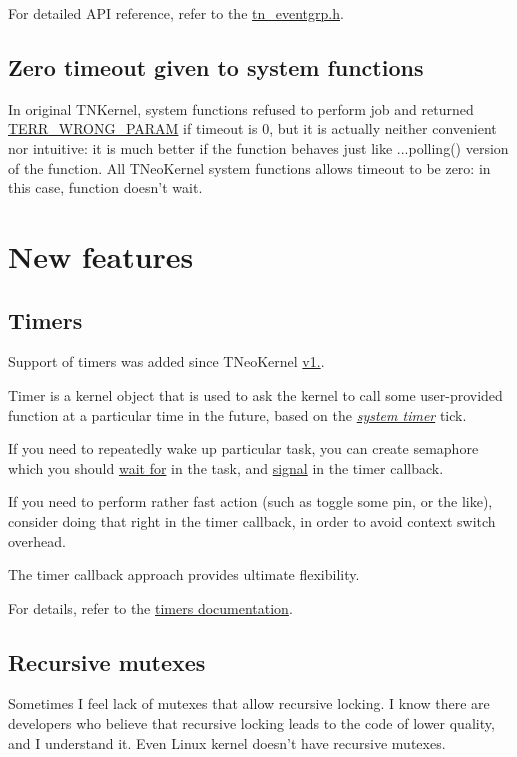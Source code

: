 For detailed A\+P\+I reference, refer to the {\ttfamily \hyperlink{tn__eventgrp_8h}{tn\+\_\+eventgrp.\+h}}.\hypertarget{tnkernel_diff_tnkernel_diff_zero_timeout}{}\subsection{Zero timeout given to system functions}\label{tnkernel_diff_tnkernel_diff_zero_timeout}
In original T\+N\+Kernel, system functions refused to perform job and returned {\ttfamily \hyperlink{tn__oldsymbols_8h_a35ec519d54f884d84c5814f49f00a22b}{T\+E\+R\+R\+\_\+\+W\+R\+O\+N\+G\+\_\+\+P\+A\+R\+A\+M}} if {\ttfamily timeout} is 0, but it is actually neither convenient nor intuitive\+: it is much better if the function behaves just like {\ttfamily ...polling()} version of the function. All T\+Neo\+Kernel system functions allows timeout to be zero\+: in this case, function doesn't wait.\hypertarget{tnkernel_diff_tnkernel_new_features}{}\section{New features}\label{tnkernel_diff_tnkernel_new_features}
\hypertarget{tnkernel_diff_tnkernel_new_features__timer}{}\subsection{Timers}\label{tnkernel_diff_tnkernel_new_features__timer}
Support of timers was added since T\+Neo\+Kernel \hyperlink{changelog_changelog_v1_02}{v1.}.

Timer is a kernel object that is used to ask the kernel to call some user-\/provided function at a particular time in the future, based on the {\itshape \hyperlink{quick_guide_time_ticks}{system timer}} tick.

If you need to repeatedly wake up particular task, you can create semaphore which you should \hyperlink{tn__sem_8h_a6bf88a78f4f8b2799f72ee671b52ed97}{wait for} in the task, and \hyperlink{tn__sem_8h_a215fd97b86fc63192106bb30b0574d14}{signal} in the timer callback.

If you need to perform rather fast action (such as toggle some pin, or the like), consider doing that right in the timer callback, in order to avoid context switch overhead.

The timer callback approach provides ultimate flexibility.

For details, refer to the \hyperlink{tn__timer_8h}{timers documentation}.\hypertarget{tnkernel_diff_tnkernel_diff_mutex_rec}{}\subsection{Recursive mutexes}\label{tnkernel_diff_tnkernel_diff_mutex_rec}
Sometimes I feel lack of mutexes that allow recursive locking. I know there are developers who believe that recursive locking leads to the code of lower quality, and I understand it. Even Linux kernel doesn't have recursive mutexes.

